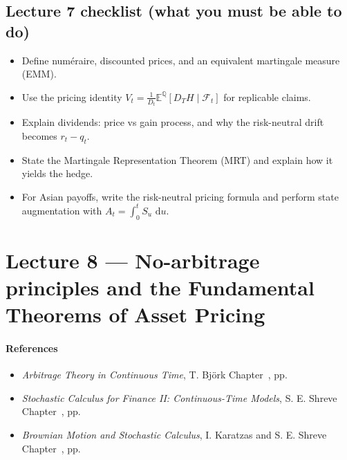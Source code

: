 \documentclass[11pt]{article}
\newcommand{\F}{\mathcal{F}}
\newcommand{\Qbb}{\mathbb{Q}}
\newcommand{\E}{\mathbb{E}}
\newcommand{\dd}{\,\mathrm{d}}
\newcommand{\1}{\mathbf{1}}
\theoremstyle{plain}
\theoremstyle{definition}
\theoremstyle{remark}
\begin{document}
\subsection{Lecture 7 checklist (what you must be able to do)}
\begin{itemize}[leftmargin=1.6em, itemsep=0.25em]
\item Define num\'eraire, discounted prices, and an equivalent martingale measure (EMM).
\item Use the pricing identity $V_t=\frac{1}{D_t}\E^{\Qbb}[D_T H\mid\F_t]$ for replicable claims.
\item Explain dividends: price vs gain process, and why the risk-neutral drift becomes $r_t-q_t$.
\item State the Martingale Representation Theorem (MRT) and explain how it yields the hedge.
\item For Asian payoffs, write the risk-neutral pricing formula and perform state augmentation with $A_t=\int_0^t S_u\,\dd u$.
\end{itemize}




\section{Lecture 8 --- No-arbitrage principles and the Fundamental Theorems of Asset Pricing}


\paragraph{References}

\begin{itemize}[leftmargin=1.4em]

\item \textit{Arbitrage Theory in Continuous Time},  
T. Björk  
\hfill Chapter~\underline{\hspace{1cm}}, pp.~\underline{\hspace{1cm}}

\item \textit{Stochastic Calculus for Finance II: Continuous-Time Models},  
S. E. Shreve  
\hfill Chapter~\underline{\hspace{1cm}}, pp.~\underline{\hspace{1cm}}

\item \textit{Brownian Motion and Stochastic Calculus},  
I. Karatzas and S. E. Shreve  
\hfill Chapter~\underline{\hspace{1cm}}, pp.~\underline{\hspace{1cm}}

\end{itemize}
\end{document}
